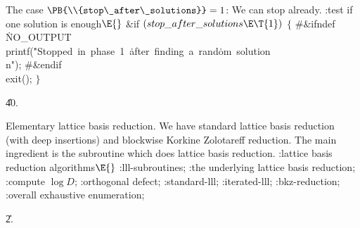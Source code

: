 The case $\PB{\\{stop\_after\_solutions}}=1$: We can stop already.
\Y\B\4:test if one solution is enough\X${}\E{}$\6
\&{if} ${}(\\{stop\_after\_solutions}\E\T{1}){}$\5
${}\{{}$\6
\8\#\&{ifndef} \.{NO\_OUTPUT}\1\6
\\{printf}(\.{"Stopped\ in\ phase\ 1\ }\)\.{after\ finding\ a\ rand}\)\.{om\
solution\\n"});\6
\8\#\&{endif}\6
\\{exit}();\6
\4${}\}{}$\2\par
\U40.\fi

Elementary lattice basis reduction. We have
standard lattice basis reduction (with deep insertions) and blockwise
Korkine Zolotareff reduction. The main ingredient is the subroutine
\PB{\\{lllfp}} which does lattice basis reduction.
\Y\B\4:lattice basis reduction algorithms\X${}\E{}$\6
:lll-subroutines\X;\6
:the underlying lattice basis reduction\X;\6
:compute $\log D$\X;\6
:orthogonal defect\X;\6
:standard-lll\X;\6
:iterated-lll\X;\6
:bkz-reduction\X;\6
:overall exhaustive enumeration\X;\par
\U2.\fi

